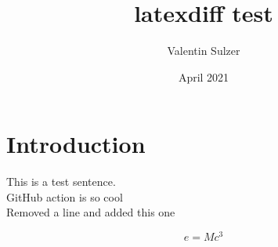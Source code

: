 \documentclass{article}
\title{latexdiff test}
\author{Valentin Sulzer}
\date{April 2021}
\begin{document}
\maketitle

\section{Introduction}

This is a test sentence.
\\GitHub action is so cool
\\Removed a line and added this one

\begin{equation}
    e = Mc^3
\end{equation}
\end{document}
